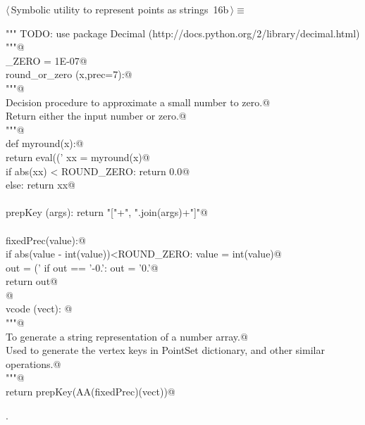 \documentclass[11pt,oneside]{article}	%
\begin{document}
\begin{flushleft} \small \label{scrap41}
\protect{}$\langle\,$Symbolic utility to represent points as strings\nobreak\ {\footnotesize 16b}$\,\rangle\equiv$
\vspace{-1ex}
\begin{list}{}{} \item
\mbox{}\verb@""" TODO: use package Decimal (http://docs.python.org/2/library/decimal.html) """@\\
\mbox{}\verb@ROUND_ZERO = 1E-07@\\
\mbox{}\verb@def round_or_zero (x,prec=7):@\\
\mbox{}\verb@   """@\\
\mbox{}\verb@   Decision procedure to approximate a small number to zero.@\\
\mbox{}\verb@   Return either the input number or zero.@\\
\mbox{}\verb@   """@\\
\mbox{}\verb@   def myround(x):@\\
\mbox{}\verb@      return eval(('%.'+str(prec)+'f') % round(x,prec))@\\
\mbox{}\verb@   xx = myround(x)@\\
\mbox{}\verb@   if abs(xx) < ROUND_ZERO: return 0.0@\\
\mbox{}\verb@   else: return xx@\\
\mbox{}\verb@@\\
\mbox{}\verb@def prepKey (args): return "["+", ".join(args)+"]"@\\
\mbox{}\verb@@\\
\mbox{}\verb@def fixedPrec(value):@\\
\mbox{}\verb@   if abs(value - int(value))<ROUND_ZERO: value = int(value)@\\
\mbox{}\verb@   out = ('%0.7f'% value).rstrip('0')@\\
\mbox{}\verb@   if out == '-0.': out = '0.'@\\
\mbox{}\verb@   return out@\\
\mbox{}\verb@   @\\
\mbox{}\verb@def vcode (vect): @\\
\mbox{}\verb@   """@\\
\mbox{}\verb@   To generate a string representation of a number array.@\\
\mbox{}\verb@   Used to generate the vertex keys in PointSet dictionary, and other similar operations.@\\
\mbox{}\verb@   """@\\
\mbox{}\verb@   return prepKey(AA(fixedPrec)(vect))@\\
\mbox{}\verb@@{\NWsep}
\end{list}
\vspace{-1ex}
\footnotesize\addtolength{\baselineskip}{-1ex}
\begin{list}{}{\setlength{\itemsep}{-\parsep}\setlength{\itemindent}{-\leftmargin}}
\item {\NWtxtMacroNoRef}.
\end{list}
\end{flushleft}




\end{document}
